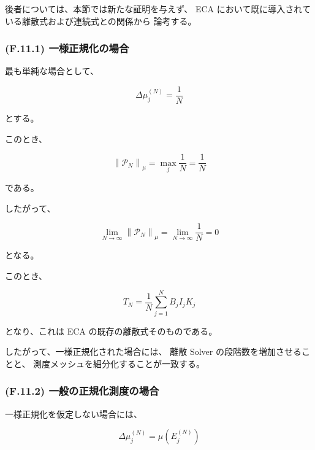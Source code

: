 \documentclass[a4paper,11pt]{article}
\begin{document}
後者については、本節では新たな証明を与えず、
ECA において既に導入されている離散式および連続式との関係から
論考する。


\subsubsection{(F.11.1) 一様正規化の場合}
\label{subsubsec:F11-1}

最も単純な場合として、

\begin{equation}
    \Delta\mu_j^{(N)}
    =
    \frac1N
\end{equation}

とする。

このとき、

\begin{equation}
    \left\|
    \mathcal{P}_N
    \right\|_\mu
    =
    \max_j\frac1N
    =
    \frac1N
\end{equation}

である。

したがって、

\begin{equation}
    \lim_{N\to\infty}
    \left\|
    \mathcal{P}_N
    \right\|_\mu
    =
    \lim_{N\to\infty}
    \frac1N
    =
    0
\end{equation}

となる。

このとき、

\begin{equation}
    T_N
    =
    \frac1N
    \sum_{j=1}^{N}
    B_jI_jK_j
\end{equation}

となり、これは ECA の既存の離散式そのものである。

したがって、一様正規化された場合には、
離散 Solver の段階数を増加させることと、
測度メッシュを細分化することが一致する。


\subsubsection{(F.11.2) 一般の正規化測度の場合}
\label{subsubsec:F11-2}

一様正規化を仮定しない場合には、

\begin{equation}
    \Delta\mu_j^{(N)}
    =
    \mu\!\left(E_j^{(N)}\right)
\end{equation}
\end{document}
